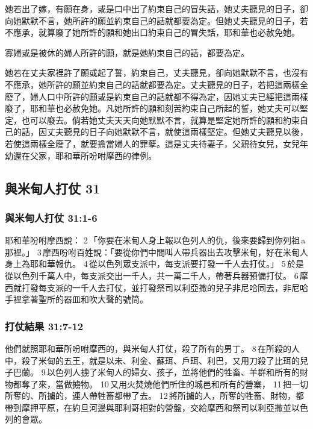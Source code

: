 她若出了嫁，有願在身，或是口中出了約束自己的冒失話，她丈夫聽見的日子，卻向她默默不言，她所許的願並約束自己的話就都要為定。但她丈夫聽見的日子，若不應承，就算廢了她所許的願和她出口約束自己的冒失話，耶和華也必赦免她。

寡婦或是被休的婦人所許的願，就是她約束自己的話，都要為定。 

她若在丈夫家裡許了願或起了誓，約束自己，丈夫聽見，卻向她默默不言，也沒有不應承，她所許的願並約束自己的話就都要為定。丈夫聽見的日子，若把這兩樣全廢了，婦人口中所許的願或是約束自己的話就都不得為定，因她丈夫已經把這兩樣廢了，耶和華也必赦免她。凡她所許的願和刻苦約束自己所起的誓，她丈夫可以堅定，也可以廢去。倘若她丈夫天天向她默默不言，就算是堅定她所許的願和約束自己的話，因丈夫聽見的日子向她默默不言，就使這兩樣堅定。但她丈夫聽見以後，若使這兩樣全廢了，就要擔當婦人的罪孽。這是丈夫待妻子，父親待女兒，女兒年幼還在父家，耶和華所吩咐摩西的律例。



\subsection{與米甸人打仗 31}
\subsubsection{與米甸人打仗 31:1-6}
耶和華吩咐摩西說： 2 「你要在米甸人身上報以色列人的仇，後來要歸到你列祖 a那裡。」 3 摩西吩咐百姓說：「要從你們中間叫人帶兵器出去攻擊米甸，好在米甸人身上為耶和華報仇。 4 從以色列眾支派中，每支派要打發一千人去打仗。」 5 於是從以色列千萬人中，每支派交出一千人，共一萬二千人，帶著兵器預備打仗。 6 摩西就打發每支派的一千人去打仗，並打發祭司以利亞撒的兒子非尼哈同去，非尼哈手裡拿著聖所的器皿和吹大聲的號筒。

\subsubsection{打仗結果 31:7-12}
他們就照耶和華所吩咐摩西的，與米甸人打仗，殺了所有的男丁。 8 在所殺的人中，殺了米甸的五王，就是以未、利金、蘇珥、戶珥、利巴，又用刀殺了比珥的兒子巴蘭。 9 以色列人擄了米甸人的婦女、孩子，並將他們的牲畜、羊群和所有的財物都奪了來，當做擄物。 10 又用火焚燒他們所住的城邑和所有的營寨， 11 把一切所奪的、所擄的，連人帶牲畜都帶了去。 12 將所擄的人，所奪的牲畜、財物，都帶到摩押平原，在約旦河邊與耶利哥相對的營盤，交給摩西和祭司以利亞撒並以色列的會眾。


